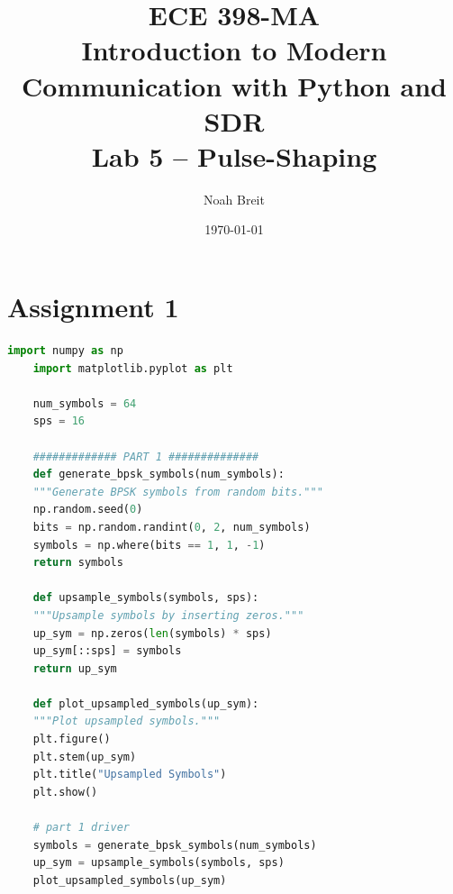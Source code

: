\documentclass[
	letterpaper, %
	10pt, %
]{CSUniSchoolLabReport}
\title{ECE 398-MA \\ Introduction to Modern Communication with Python and SDR \\ Lab 5 -- Pulse-Shaping} %
\author{Noah Breit} %
\date{\today} %
\begin{document}
\maketitle %




\section{Assignment 1}

\begin{lstlisting}[language=Python]
	import numpy as np
	import matplotlib.pyplot as plt
	
	num_symbols = 64
	sps = 16
	
	############# PART 1 ##############
	def generate_bpsk_symbols(num_symbols):
	"""Generate BPSK symbols from random bits."""
	np.random.seed(0)
	bits = np.random.randint(0, 2, num_symbols)
	symbols = np.where(bits == 1, 1, -1)
	return symbols
	
	def upsample_symbols(symbols, sps):
	"""Upsample symbols by inserting zeros."""
	up_sym = np.zeros(len(symbols) * sps)
	up_sym[::sps] = symbols
	return up_sym
	
	def plot_upsampled_symbols(up_sym):
	"""Plot upsampled symbols."""
	plt.figure()
	plt.stem(up_sym)
	plt.title("Upsampled Symbols")
	plt.show()
	
	# part 1 driver
	symbols = generate_bpsk_symbols(num_symbols)
	up_sym = upsample_symbols(symbols, sps)
	plot_upsampled_symbols(up_sym)
	
\end{lstlisting}
\end{document}
